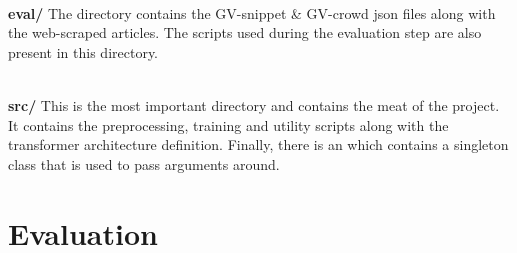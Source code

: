 \documentclass[12pt,a4paper,twoside,openright]{report}
\begin{document}
\phantom{.}\\
\textbf{eval/} The directory contains the GV-snippet \& GV-crowd json files along with the web-scraped articles. The scripts used during the evaluation step are also present in this directory.

\phantom{.}\\
\textbf{src/} This is the most important directory and contains the meat of the project. It contains the preprocessing, training and utility scripts along with the transformer architecture definition. Finally, there is an  which contains a singleton class that is used to pass arguments around.






\chapter{Evaluation}
\label{evaluation}
\end{document}
